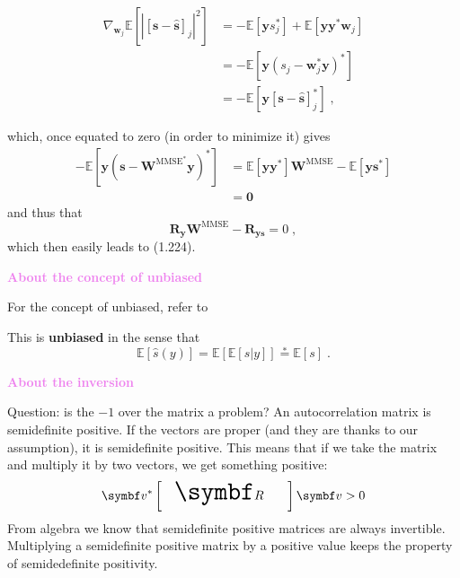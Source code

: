\documentclass[a4paper, 12pt]{book}
\begin{document}
\begin{align*}
\nabla_{\bm{w}_j} \mathbb{E}\left[ |[\bm{s} - \hat{\bm{s}}]_j|^2 \right] &= -\mathbb{E}\left[ \bm{y}s_j^* \right] + \mathbb{E}\left[ \bm{y}\bm{y}^*\bm{w}_j \right] \\
&= -\mathbb{E}\left[ \bm{y}(s_j - \bm{w}_j^*\bm{y})^* \right] \\
&= -\mathbb{E}\left[ \bm{y}[\bm{s} - \hat{\bm{s}}]_j^* \right] \;,
\end{align*}

which, once equated to zero (in order to minimize it) gives
\begin{align*}
-\mathbb{E}\left[ \bm{y}(\bm{s} - \bm{W}^{\text{MMSE}^*}\bm{y})^* \right] &= \mathbb{E}[\bm{y}\bm{y}^*]\bm{W}^{\text{MMSE}} - \mathbb{E}[\bm{y}\bm{s}^*] \\
&= \bm{0}
\end{align*}
and thus that
\begin{equation}
\bm{R}_{\bm{y}}\bm{W}^{\text{MMSE}} - \bm{R}_{\bm{ys}} = 0 \;, \tag{1.233}
\end{equation}
which then easily leads to (1.224).

\begin{tcolorbox}[colframe=violet!80!white, colback=white, boxrule=1pt, arc=2pt]
    \textcolor{violet}{\textbf{About the concept of unbiased}}

    For the concept of unbiased, refer to
    \begin{tcolorbox}[sharp corners, boxrule=0pt, leftrule=2pt, colframe=green!60!black, colback=green!5, left=5pt, top=3pt, bottom=3pt]
    This is \textbf{unbiased} in the sense that
    \begin{equation}
    \mathbb{E}[\hat{s}(y)] = \mathbb{E}[\mathbb{E}[s|y]] \stackrel{*}{=} \mathbb{E}[s] \;. \tag{1.153}
    \end{equation}
    \end{tcolorbox}
\end{tcolorbox}

\begin{tcolorbox}[colframe=violet!80!white, colback=white, boxrule=1pt, arc=2pt]
    \textcolor{violet}{\textbf{About the inversion}}

    Question: is the $-1$ over the matrix a problem? An autocorrelation matrix is semidefinite positive. If the vectors are proper (and they are thanks to our assumption), it is semidefinite positive.
    This means that if we take the matrix and multiply it by two vectors, we get something positive:
    $$
    \bm{v}^* \left[ \quad \huge \bm{R} \quad \right] \bm{v} > 0
    $$
    From algebra we know that semidefinite positive matrices are always invertible. Multiplying a semidefinite positive matrix by a positive value keeps the property of semidedefinite positivity.
\end{tcolorbox}
\end{document}
